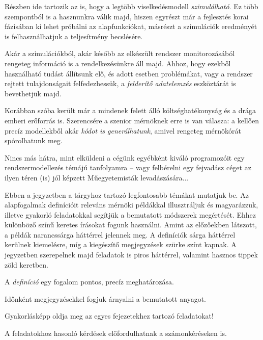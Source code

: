 \begin{pelda}
	Részben ide tartozik az is, hogy a legtöbb viselkedésmodell \emph{szimulálható}. Ez több szempontból is a hasznunkra válik majd, hiszen egyrészt már a fejlesztés korai fázisában ki lehet próbálni az alapfunkciókat, másrészt a szimulációk eredményét is felhasználhatjuk a teljesítmény becslésére.
	
	Akár a szimulációkból, akár később az elkészült rendszer monitorozásából rengeteg információ is a rendelkezésünkre áll majd. Ahhoz, hogy ezekből használható tudást állítsunk elő, és adott esetben problémákat, vagy a rendszer rejtett tulajdonságait felfedezhessük, a \emph{felderítő adatelemzés} eszköztárát is bevethetjük majd.
	
	Korábban szóba került már a mindenek felett álló költséghatékonyság és a drága emberi erőforrás is. Szerencsére a szenior mérnöknek erre is van válasza: a kellően precíz modellekből akár \emph{kódot is generálhatunk}, amivel rengeteg mérnökórát spórolhatunk meg.
	
	Nincs más hátra, mint elküldeni a cégünk egyébként kiváló programozóit egy rendszermodellezés témájú tanfolyamra -- vagy felbérelni egy fejvadász céget az ilyen téren (is) jól képzett Műegyetemisták levadászására...
\end{pelda}

Ebben a jegyzetben a tárgyhoz tartozó legfontosabb témákat mutatjuk be. Az alapfogalmak definícióit releváns mérnöki példákkal illusztráljuk és magyarázzuk, illetve gyakorló feladatokkal segítjük a bemutatott módszerek megértését.
Ehhez különböző színű keretes írásokat fogunk használni. Amint az előzőekben látszott, a példák narancssárga háttérrel jelennek meg. A definíciók sárga háttérrel kerülnek kiemelésre, míg a kiegészítő megjegyzések szürke színt kapnak. A jegyzetben szerepelnek majd feladatok is piros háttérrel, valamint hasznos tippek zöld keretben.

\begin{definicio}
	A \emph{definíció} egy fogalom pontos, precíz meghatározása.
\end{definicio}

\begin{megjegyzes}
	Időnként megjegyzésekkel fogjuk árnyalni a bemutatott anyagot.
\end{megjegyzes}

\begin{feladat}
	Gyakorlásképp oldja meg az egyes fejezetekhez tartozó feladatokat!
\end{feladat}

\begin{tipp}
	A feladatokhoz hasonló kérdések előfordulhatnak a számonkéréseken is.
\end{tipp}
